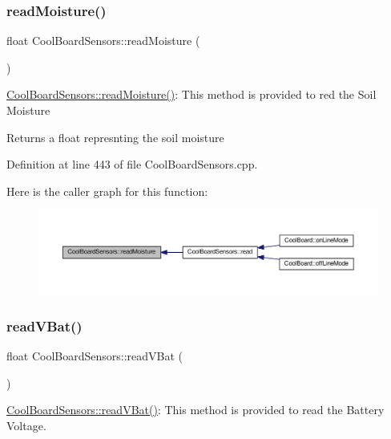 \subsubsection{\texorpdfstring{read\+Moisture()}{readMoisture()}}
{\footnotesize\ttfamily float Cool\+Board\+Sensors\+::read\+Moisture (\begin{DoxyParamCaption}{ }\end{DoxyParamCaption})}

\hyperlink{class_cool_board_sensors_a8761bff50373c485f4465c8db47d0633}{Cool\+Board\+Sensors\+::read\+Moisture()}\+: This method is provided to red the Soil Moisture

\begin{DoxyReturn}{Returns}
a float represnting the soil moisture 
\end{DoxyReturn}


Definition at line 443 of file Cool\+Board\+Sensors.\+cpp.

Here is the caller graph for this function\+:\nopagebreak
\begin{figure}[H]
\begin{center}
\leavevmode
\includegraphics[width=350pt]{class_cool_board_sensors_a8761bff50373c485f4465c8db47d0633_icgraph}
\end{center}
\end{figure}
\mbox{\label{class_cool_board_sensors_a6944b6ea7bce8e2fce1b434acfd9d5f3}} 
\subsubsection{\texorpdfstring{read\+V\+Bat()}{readVBat()}}
{\footnotesize\ttfamily float Cool\+Board\+Sensors\+::read\+V\+Bat (\begin{DoxyParamCaption}{ }\end{DoxyParamCaption})}

\hyperlink{class_cool_board_sensors_a6944b6ea7bce8e2fce1b434acfd9d5f3}{Cool\+Board\+Sensors\+::read\+V\+Bat()}\+: This method is provided to read the Battery Voltage.

